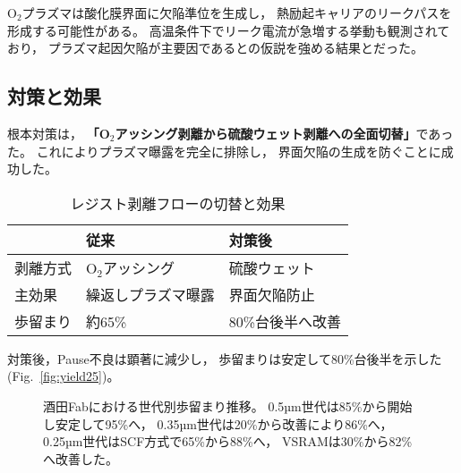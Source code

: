 \documentclass[conference]{IEEEtran}
\begin{document}
O$_2$プラズマは酸化膜界面に欠陥準位を生成し，
熱励起キャリアのリークパスを形成する可能性がある。  
高温条件下でリーク電流が急増する挙動も観測されており，
プラズマ起因欠陥が主要因であるとの仮説を強める結果とだった。

\subsection{対策と効果}
根本対策は，
\textbf{「O$_2$アッシング剥離から硫酸ウェット剥離への全面切替」}であった。  
これによりプラズマ曝露を完全に排除し，
界面欠陥の生成を防ぐことに成功した。  

\begin{table}[h]
  \centering
  \caption{レジスト剥離フローの切替と効果}
  \label{tab:resist}
  \begin{tabular}{lll}
    \toprule
    & 従来 & 対策後 \\
    \midrule
    剥離方式 & O$_2$アッシング & 硫酸ウェット \\
    主効果 & 繰返しプラズマ曝露 & 界面欠陥防止 \\
    歩留まり & 約65\% & 80\%台後半へ改善 \\
    \bottomrule
  \end{tabular}
\end{table}

対策後，Pause不良は顕著に減少し，
歩留まりは安定して80\%台後半を示した
(Fig.~\ref{fig:yield25})。  

\begin{figure}[t]
\centering
{}
\caption{酒田Fabにおける世代別歩留まり推移。
0.5µm世代は85\%から開始し安定して95\%へ，
0.35µm世代は20\%から改善により86\%へ，
0.25µm世代はSCF方式で65\%から88\%へ，
VSRAMは30\%から82\%へ改善した。}
\label{fig:yield_all}
\end{figure}
\end{document}
